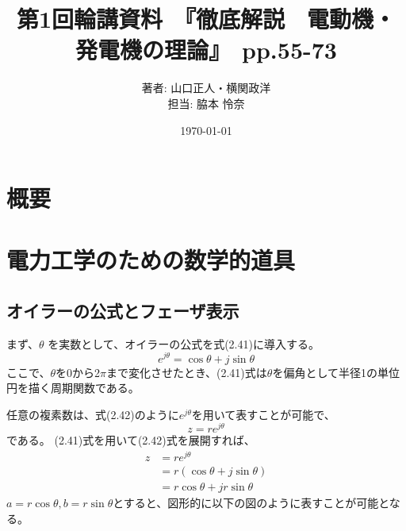 \documentclass{article}
\begin{document}
\title{第1回輪講資料　『徹底解説　電動機・発電機の理論』　pp.55-73}
\author{著者: 山口正人・横関政洋 \\ 担当: 脇本 怜奈}
\date{\today}
\maketitle

\section*{概要}


\setcounter{section}{3}
\setcounter{equation}{40}
\renewcommand{\thesection}{2.\arabic{section}}
\renewcommand{\theequation}{2.\arabic{equation}}

\section{電力工学のための数学的道具} 

\subsection{オイラーの公式とフェーザ表示}
まず、\(\theta\) を実数として、オイラーの公式を式(2.41)に導入する。
\begin{equation}
    e^{j\theta} = \cos\theta + j \sin\theta
\end{equation}
ここで、\(\theta\)を0から2\(\pi\)まで変化させたとき、(2.41)式は\(\theta\)を偏角として半径1の単位円を描く周期関数である。

任意の複素数は、式(2.42)のように\(e^{j\theta}\)を用いて表すことが可能で、
\begin{equation}
    z = re^{j\theta}
\end{equation}
である。
(2.41)式を用いて(2.42)式を展開すれば、
\begin{align}
    z &= re^{j\theta} \\
       &=r(\cos\theta + j\sin\theta) \\
       &=r\cos\theta + jr\sin\theta
\end{align}
\(a=r\cos\theta, b=r\sin\theta\)とすると、図形的に以下の図のように表すことが可能となる。
\end{document}
